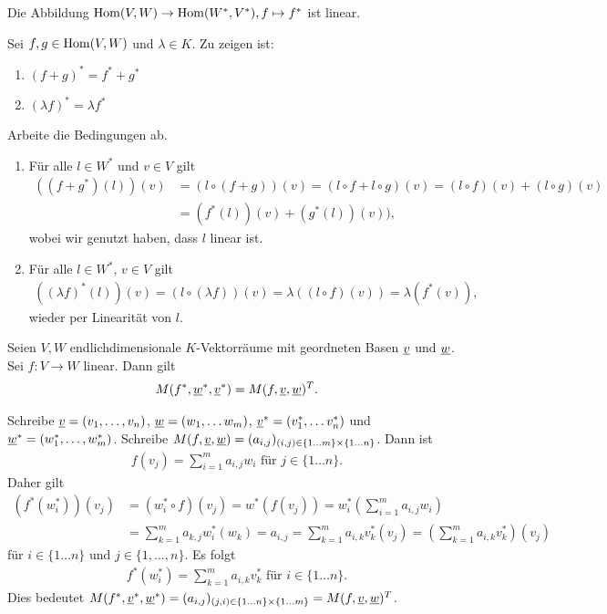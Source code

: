 \documentclass[../../main.tex]{subfiles}
\begin{document}
\begin{pro}\label{13.1.10}
	Die Abbildung $\operatorname{Hom}(V,W)\to \operatorname{Hom}(W^*,V^*), f\mapsto f^*$ ist linear.
\end{pro}
\begin{cproof}
	Sei $f,g\in \operatorname{Hom}(V,W)$ und $\lambda\in K$. Zu zeigen ist:
	\begin{enumerate}[\normalfont(a)]
		\item $(f+g)^*=f^*+g^*$
		\item $(\lambda f)^*=\lambda f^*$
	\end{enumerate}
	Arbeite die Bedingungen ab. 
	\begin{enumerate}[\normalfont(a)]
		\item Für alle $l\in W^*$ und $v\in V$ gilt
		\begin{align*}
			((f+g^*)(l))(v)&=(l\circ (f+g))(v)=(l\circ f+l\circ g)(v)=(l\circ f)(v)+(l\circ g)(v)\\
			&=(f^*(l))(v)+(g^*(l))(v)),
		\end{align*}
		wobei wir genutzt haben, dass $l$ linear ist.
		\item Für alle $l\in W^*$, $v\in V$ gilt
		\begin{align*}
			((\lambda f)^*(l))(v)=(l\circ (\lambda f))(v)=\lambda((l\circ f)(v))=\lambda(f^*(v)),
		\end{align*}
		wieder per Linearität von $l$.
	\end{enumerate}
\end{cproof}

\begin{pro}\label{13.1.11}
	Seien $V,W$ endlichdimensionale $K$-Vektorräume mit geordneten Basen ${\underline v}$ und ${\underline w}$. Sei $f: V\to W$ linear. Dann gilt
	\begin{align*}
		M(f^*,{\underline w}^*,{\underline v}^*)=M(f,{\underline v},{\underline w})^T.
	\end{align*}
	\begin{center}
	\end{center}
\end{pro}
\begin{cproof}
	Schreibe ${\underline v}=(v_1,\ldots ,v_n)$, ${\underline w}=(w_1,\ldots w_m)$, ${\underline v}^*=(v_1^*,\ldots v_n^*)$ und ${\underline w}^*=(w_1^*,\ldots ,w_m^*)$. Schreibe $M(f,{\underline v},{\underline w})=(a_{i,j})_{(i,j)\in \{1\ldots m\}\times\{1\ldots n\}}$. Dann ist
	\begin{align*}
		f(v_j)=\sum^m_{i=1}a_{i,j}w_i \text{ für } j\in\{1\ldots n\}.
	\end{align*}
	Daher gilt
	\begin{align*}
		(f^*(w_i^*))(v_j)&=(w_i^*\circ f)(v_j)=w^*(f(v_j))=w^*_i\left(\sum^m_{i=1}a_{i,j}w_i \right)\\
		&=\sum^m_{k=1}a_{k,j}w_i^*(w_k)=a_{i,j}=\sum^m_{k=1}a_{i,k}v_k^*(v_j)=\left(\sum^m_{k=1}a_{i,k}v_k^*\right)(v_j)
	\end{align*}
	für $i\in\{1\ldots n\}$ und $j\in\{1,\ldots ,n\}$. Es folgt
	\begin{align*}
		f^*(w_i^*)=\sum^m_{k=1}a_{i,k}v_k^*\text{ für }i\in\{1\ldots n\}.
	\end{align*}
	Dies bedeutet $M(f^*,{\underline v}^*,{\underline w}^*)=(a_{i,j})_{(j,i)\in \{1\ldots n\}\times\{1\ldots m\}}=M(f,\underline{v},\underline{w})^T$.
\end{cproof}
	
\end{document}

